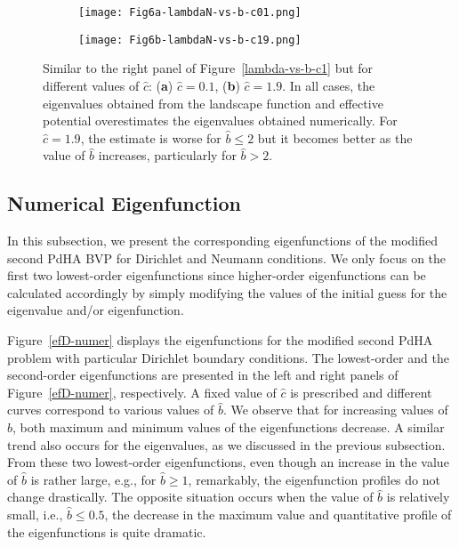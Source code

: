 \documentclass[symmetry,article,accept,moreauthors,pdftex,a4paper]{mdpi}
\begin{document}
\begin{figure}[H]
\widefigure
\begin{subfigure}{0.45\textwidth}
\caption{} \vspace{0.1cm}
\texttt{[image: Fig6a-lambdaN-vs-b-c01.png]}
\end{subfigure}	\hspace*{0.5cm}
\begin{subfigure}{0.45\textwidth}
\caption{} \vspace{0.1cm}
\texttt{[image: Fig6b-lambdaN-vs-b-c19.png]}
\end{subfigure}
\caption{Similar to the right panel of Figure~\ref{lambda-vs-b-c1} but for different values of $\widehat{c}$: (\textbf{a}) $\widehat{c} = 0.1$, (\textbf{b}) $\widehat{c} = 1.9$. In all cases, the eigenvalues obtained from the landscape function and effective potential overestimates the eigenvalues obtained numerically. For $\widehat{c} = 1.9$, the estimate is worse for $\widehat{b} \leq 2$ but it becomes better as the value of $\widehat{b}$ increases, particularly for $\widehat{b} > 2$.}		\label{lambda-vs-b-c01-19}
\end{figure}
\begin{paracol}{2}
\switchcolumn

\subsection{Numerical Eigenfunction}

In this subsection, we present the corresponding eigenfunctions of the modified second PdHA BVP for Dirichlet and Neumann conditions. We only focus on the first two lowest-order eigenfunctions since higher-order eigenfunctions can be calculated accordingly by simply modifying the values of the initial guess for the eigenvalue and/or eigenfunction.

Figure~\ref{efD-numer} displays the eigenfunctions for the modified second PdHA problem with particular Dirichlet boundary conditions. The lowest-order and the second-order eigenfunctions are presented in the left and right panels of Figure~\ref{efD-numer}, respectively. A fixed value of $\widehat{c}$ is prescribed and different curves correspond to various values of $\widehat{b}$. We observe that for increasing { values} of $\widehat{b}$, both maximum and minimum values of the eigenfunctions decrease. A similar trend also occurs for the eigenvalues, as we  discussed in the previous subsection. From these two lowest-order eigenfunctions, even though an increase in the value of $\widehat{b}$ is rather large, e.g., for $\widehat{b} \geq 1$, remarkably, the eigenfunction profiles do not change drastically. The opposite situation occurs when the value of $\widehat{b}$ is relatively small, i.e., $\widehat{b} \leq 0.5$, the decrease in the maximum value and quantitative profile of the eigenfunctions is quite dramatic. 
\end{paracol}
\end{document}
